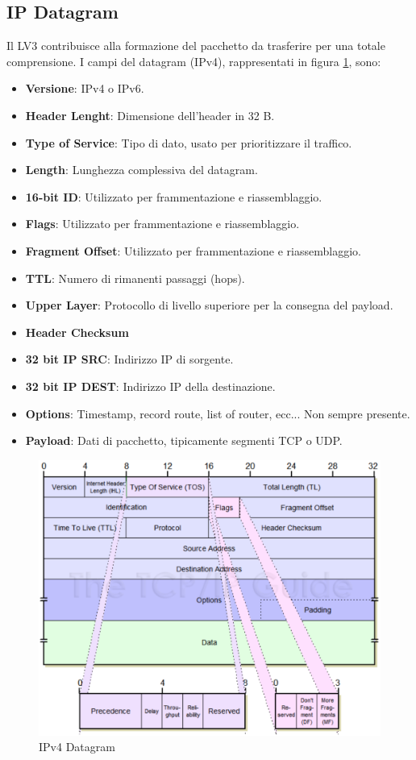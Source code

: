 \documentclass[12pt]{article}
\begin{document}
\subsection{IP Datagram}
Il LV3 contribuisce alla formazione del pacchetto da trasferire per una totale comprensione. I campi del datagram (IPv4), rappresentati in figura \ref{fig:ipdata}, sono:
\begin{itemize}
  \item \textbf{Versione}: IPv4 o IPv6.
  \item \textbf{Header Lenght}: Dimensione dell'header in 32 B.
  \item \textbf{Type of Service}: Tipo di dato, usato per prioritizzare il traffico.
  \item \textbf{Length}: Lunghezza complessiva del datagram.
  \item \textbf{16-bit ID}: Utilizzato per frammentazione e riassemblaggio.
  \item \textbf{Flags}: Utilizzato per frammentazione e riassemblaggio.
  \item \textbf{Fragment Offset}: Utilizzato per frammentazione e riassemblaggio.
  \item \textbf{TTL}: Numero di rimanenti passaggi (hops).
  \item \textbf{Upper Layer}: Protocollo di livello superiore per la consegna del payload.
  \item \textbf{Header Checksum}
  \item \textbf{32 bit IP SRC}: Indirizzo IP di sorgente.
  \item \textbf{32 bit IP DEST}: Indirizzo IP della destinazione.
  \item \textbf{Options}: Timestamp, record route, list of router, ecc... Non sempre presente.
  \item \textbf{Payload}: Dati di pacchetto, tipicamente segmenti TCP o UDP.
\end{itemize}

\begin{figure}[!hp]
  \includegraphics[width=\textwidth]{images/ipheader.png}
  \caption{IPv4 Datagram}
  \label{fig:ipdata}
\end{figure}
\end{document}
